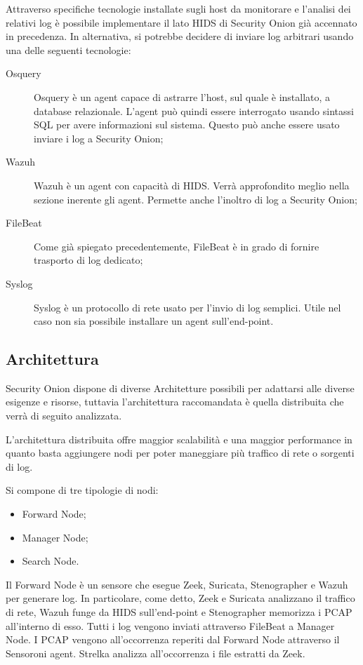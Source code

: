 Attraverso specifiche tecnologie installate sugli host da monitorare e l'analisi dei relativi log è possibile implementare il lato HIDS di Security Onion già accennato in precedenza.
In alternativa, si potrebbe decidere di inviare log arbitrari usando una delle seguenti tecnologie:
\begin{description}
    \item[Osquery] Osquery \cite{osquery} è un agent  capace di astrarre l'host, sul quale è installato, a database relazionale. L'agent può quindi essere interrogato usando sintassi SQL per avere informazioni sul sistema. Questo può anche essere usato inviare i log a Security Onion;
    \item[Wazuh] Wazuh \cite{wazuh} è un agent con capacità di HIDS. Verrà approfondito meglio nella sezione inerente gli agent. Permette anche l'inoltro di log a Security Onion;
    \item[FileBeat] Come già spiegato precedentemente, FileBeat \cite{filebeat} è in grado di fornire trasporto di log dedicato;
    \item [Syslog] Syslog \cite{syslog} è un protocollo di rete usato per l'invio di log semplici. Utile nel caso non sia possibile installare un agent sull'end-point.
\end{description}

\subsection{Architettura}
Security Onion dispone di diverse Architetture possibili per adattarsi alle diverse esigenze e risorse, tuttavia l'architettura raccomandata è quella distribuita che verrà di seguito analizzata.

L'architettura distribuita offre maggior scalabilità e una maggior performance in quanto basta aggiungere nodi per poter maneggiare più traffico di rete o sorgenti di log.

Si compone di  tre tipologie di nodi:
\begin{itemize}
    \item Forward Node;
    \item Manager Node;
    \item Search Node.
\end{itemize}

\vspace{5mm}
Il Forward Node è un sensore che esegue Zeek, Suricata, Stenographer e Wazuh per generare log. In particolare, come detto, Zeek e Suricata analizzano il traffico di rete, Wazuh funge da HIDS sull'end-point e Stenographer memorizza i PCAP all'interno di esso. Tutti i log vengono inviati attraverso FileBeat a Manager Node. I PCAP vengono all'occorrenza reperiti dal Forward Node attraverso il Sensoroni agent.
Strelka analizza all'occorrenza i file estratti da Zeek.

